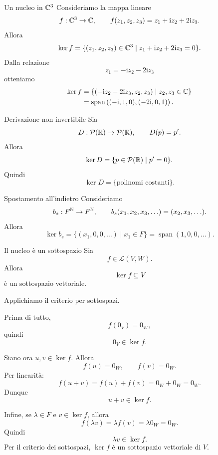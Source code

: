 \documentclass[a4paper]{article}
\begin{document}
\begin{snippetexample}{Un nucleo in \(\mathbb{C}^3\)}
    Consideriamo la mappa lineare
    \[
        f:\mathbb{C}^3\to\mathbb{C},
        \qquad
        f(z_1,z_2,z_3)=z_1+\mathrm{i}z_2+2\mathrm{i}z_3.
    \]
    Allora
    \[
        \ker f
        =
        \{(z_1,z_2,z_3)\in\mathbb{C}^3
            \mid
            z_1+\mathrm{i}z_2+2\mathrm{i}z_3=0
        \}.
    \]
    Dalla relazione
    \[
        z_1=-\mathrm{i}z_2-2\mathrm{i}z_3
    \]
    otteniamo
    \begin{align*}
        \ker f
        &=
        \{(-\mathrm{i}z_2-2\mathrm{i}z_3,z_2,z_3)
        \mid z_2,z_3\in\mathbb{C}\}\\
        &=
        \operatorname{span}
        \left(
            (-\mathrm{i},1,0),
            (-2\mathrm{i},0,1)
        \right).
    \end{align*}
\end{snippetexample}

\begin{snippetexample}{Derivazione non invertibile}
    Sia
    \[
        D:\mathcal{P}(\mathbb{R})\to\mathcal{P}(\mathbb{R}),
        \qquad
        D(p)=p'.
    \]
    Allora
    \[
        \ker D
        =
        \{p\in\mathcal{P}(\mathbb{R})\mid p'=0\}.
    \]
    Quindi
    \[
        \ker D
        =
        \{\text{polinomi costanti}\}.
    \]
\end{snippetexample}

\begin{snippetexample}{Spostamento all'indietro}
    Consideriamo
    \[
        b_s:F^{\mathbb{N}}\to F^{\mathbb{N}},
        \qquad
        b_s(x_1,x_2,x_3,\ldots)=(x_2,x_3,\ldots).
    \]
    Allora
    \[
        \ker b_s
        =
        \{(x_1,0,0,\ldots)\mid x_1\in F\}
        =
        \operatorname{span}(1,0,0,\ldots).
    \]
\end{snippetexample}

\begin{snippetproposition}{Il nucleo è un sottospazio}
    Sia
    \[
        f\in\mathcal{L}(V,W).
    \]
    Allora
    \[
        \ker f\subseteq V
    \]
    è un sottospazio vettoriale.
\end{snippetproposition}

\begin{snippetproof}{}
    Applichiamo il criterio per sottospazi.

    Prima di tutto,
    \[
        f(0_V)=0_W,
    \]
    quindi
    \[
        0_V\in\ker f.
    \]

    Siano ora \(u,v\in\ker f\). Allora
    \[
        f(u)=0_W,
        \qquad
        f(v)=0_W.
    \]
    Per linearità:
    \[
        f(u+v)=f(u)+f(v)=0_W+0_W=0_W.
    \]
    Dunque
    \[
        u+v\in\ker f.
    \]

    Infine, se \(\lambda\in F\) e \(v\in\ker f\), allora
    \[
        f(\lambda v)=\lambda f(v)=\lambda 0_W=0_W.
    \]
    Quindi
    \[
        \lambda v\in\ker f.
    \]
    Per il criterio dei sottospazi, \(\ker f\) è un sottospazio vettoriale di \(V\).
\end{snippetproof}
\end{document}
